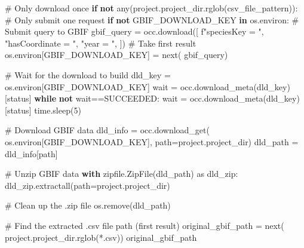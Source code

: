 \documentclass[
]{report}
\newenvironment{Shaded}{\begin{snugshade}}{\end{snugshade}}
\newcommand{\BuiltInTok}[1]{\textcolor[rgb]{0.00,0.23,0.31}{#1}}
\newcommand{\CommentTok}[1]{\textcolor[rgb]{0.37,0.37,0.37}{#1}}
\newcommand{\ControlFlowTok}[1]{\textcolor[rgb]{0.00,0.23,0.31}{\textbf{#1}}}
\newcommand{\DecValTok}[1]{\textcolor[rgb]{0.68,0.00,0.00}{#1}}
\newcommand{\ImportTok}[1]{\textcolor[rgb]{0.00,0.46,0.62}{#1}}
\newcommand{\KeywordTok}[1]{\textcolor[rgb]{0.00,0.23,0.31}{\textbf{#1}}}
\newcommand{\NormalTok}[1]{\textcolor[rgb]{0.00,0.23,0.31}{#1}}
\newcommand{\OperatorTok}[1]{\textcolor[rgb]{0.37,0.37,0.37}{#1}}
\newcommand{\SpecialStringTok}[1]{\textcolor[rgb]{0.13,0.47,0.30}{#1}}
\newcommand{\StringTok}[1]{\textcolor[rgb]{0.13,0.47,0.30}{#1}}
\begin{document}
\begin{Shaded}
\begin{Highlighting}[]
\CommentTok{\# Only download once}
\ControlFlowTok{if} \KeywordTok{not} \BuiltInTok{any}\NormalTok{(project.project\_dir.rglob(csv\_file\_pattern)):}
    \CommentTok{\# Only submit one request}
    \ControlFlowTok{if} \KeywordTok{not} \StringTok{\textquotesingle{}GBIF\_DOWNLOAD\_KEY\textquotesingle{}} \KeywordTok{in}\NormalTok{ os.environ:}
        \CommentTok{\# Submit query to GBIF}
\NormalTok{        gbif\_query }\OperatorTok{=}\NormalTok{ occ.download([}
            \SpecialStringTok{f"speciesKey = "}\NormalTok{,}
            \StringTok{"hasCoordinate = "}\NormalTok{,}
            \StringTok{"year = "}\NormalTok{,}
\NormalTok{        ])}
        \CommentTok{\# Take first result}
\NormalTok{        os.environ[}\StringTok{\textquotesingle{}GBIF\_DOWNLOAD\_KEY\textquotesingle{}}\NormalTok{] }\OperatorTok{=} \BuiltInTok{next}\NormalTok{(}
\NormalTok{            gbif\_query)}

    \CommentTok{\# Wait for the download to build}
\NormalTok{    dld\_key }\OperatorTok{=}\NormalTok{ os.environ[}\StringTok{\textquotesingle{}GBIF\_DOWNLOAD\_KEY\textquotesingle{}}\NormalTok{]}
\NormalTok{    wait }\OperatorTok{=}\NormalTok{ occ.download\_meta(dld\_key)[}\StringTok{\textquotesingle{}status\textquotesingle{}}\NormalTok{]}
    \ControlFlowTok{while} \KeywordTok{not}\NormalTok{ wait}\OperatorTok{==}\StringTok{\textquotesingle{}SUCCEEDED\textquotesingle{}}\NormalTok{:}
\NormalTok{        wait }\OperatorTok{=}\NormalTok{ occ.download\_meta(dld\_key)[}\StringTok{\textquotesingle{}status\textquotesingle{}}\NormalTok{]}
\NormalTok{        time.sleep(}\DecValTok{5}\NormalTok{)}

    \CommentTok{\# Download GBIF data}
\NormalTok{    dld\_info }\OperatorTok{=}\NormalTok{ occ.download\_get(}
\NormalTok{        os.environ[}\StringTok{\textquotesingle{}GBIF\_DOWNLOAD\_KEY\textquotesingle{}}\NormalTok{], }
\NormalTok{        path}\OperatorTok{=}\NormalTok{project.project\_dir)}
\NormalTok{    dld\_path }\OperatorTok{=}\NormalTok{ dld\_info[}\StringTok{\textquotesingle{}path\textquotesingle{}}\NormalTok{]}

    \CommentTok{\# Unzip GBIF data}
    \ControlFlowTok{with}\NormalTok{ zipfile.ZipFile(dld\_path) }\ImportTok{as}\NormalTok{ dld\_zip:}
\NormalTok{        dld\_zip.extractall(path}\OperatorTok{=}\NormalTok{project.project\_dir)}
        
    \CommentTok{\# Clean up the .zip file}
\NormalTok{    os.remove(dld\_path)}

\CommentTok{\# Find the extracted .csv file path (first result)}
\NormalTok{original\_gbif\_path }\OperatorTok{=} \BuiltInTok{next}\NormalTok{(}
\NormalTok{    project.project\_dir.rglob(}\StringTok{\textquotesingle{}*.csv\textquotesingle{}}\NormalTok{))}
\NormalTok{original\_gbif\_path}
\end{Highlighting}
\end{Shaded}
\end{document}
